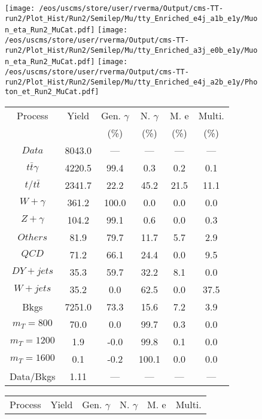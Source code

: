 \begin{figure}
\centering
\texttt{[image: /eos/uscms/store/user/rverma/Output/cms-TT-run2/Plot\_Hist/Run2/Semilep/Mu/tty\_Enriched\_e4j\_a1b\_e1y/Muon\_eta\_Run2\_MuCat.pdf]}
\texttt{[image: /eos/uscms/store/user/rverma/Output/cms-TT-run2/Plot\_Hist/Run2/Semilep/Mu/tty\_Enriched\_a3j\_e0b\_e1y/Muon\_eta\_Run2\_MuCat.pdf]}
\texttt{[image: /eos/uscms/store/user/rverma/Output/cms-TT-run2/Plot\_Hist/Run2/Semilep/Mu/tty\_Enriched\_e4j\_a2b\_e1y/Photon\_et\_Run2\_MuCat.pdf]}
\begin{minipage}[c]{0.32\textwidth}
\centering
\tiny{
\begin{tabular}{cccccc}
\hline
Process & Yield & Gen. $\gamma$ & N. $\gamma$ & M. e & Multi. \\
 &  & (\%) & (\%) & (\%) & (\%)  \\
\hline
                                                                      $ Data $ &  8043.0 &  --- &  --- &  --- &  ---\\
$ t\bar{t}\gamma $ &  4220.5 &  99.4 &  0.3 &  0.2 &  0.1\\
$ t/t\bar{t} $ &  2341.7 &  22.2 &  45.2 &  21.5 &  11.1\\
$ W+\gamma $ &  361.2 &  100.0 &  0.0 &  0.0 &  0.0\\
$ Z+\gamma $ &  104.2 &  99.1 &  0.6 &  0.0 &  0.3\\
$ Others $ &  81.9 &  79.7 &  11.7 &  5.7 &  2.9\\
$ QCD $ &  71.2 &  66.1 &  24.4 &  0.0 &  9.5\\
$ DY+jets $ &  35.3 &  59.7 &  32.2 &  8.1 &  0.0\\
$ W+jets $ &  35.2 &  0.0 &  62.5 &  0.0 &  37.5\\
Bkgs &  7251.0 &  73.3 &  15.6 &  7.2 &  3.9\\
$ m_{T} = 800 $ &  70.0 &  0.0 &  99.7 &  0.3 &  0.0\\
$ m_{T} = 1200 $ &  1.9 &  -0.0 &  99.8 &  0.1 &  0.0\\
$ m_{T} = 1600 $ &  0.1 &  -0.2 &  100.1 &  0.0 &  0.0\\
Data/Bkgs &  1.11 &  --- &  --- &  --- &  ---\\
\hline
\end{tabular}
}
\end{minipage}
\begin{minipage}[c]{0.32\textwidth}
\centering
\tiny{
\begin{tabular}{cccccc}
\hline
Process & Yield & Gen. $\gamma$ & N. $\gamma$ & M. e & Multi. \\

\end{tabular}}
\end{minipage}
\end{figure}
